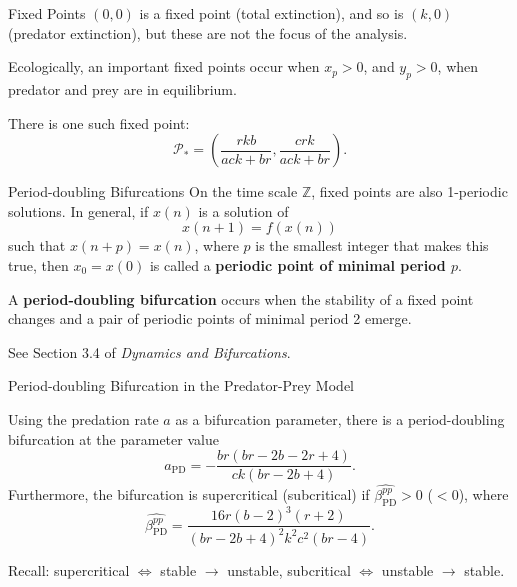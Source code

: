 \documentclass[]{beamer}
\begin{document}
	\begin{frame}{Fixed Points}
		$(0,0)$ is a fixed point (total extinction), and so is $(k,0)$ (predator extinction), but these are not the focus of the analysis.
		\vfill
		\pause
		
		Ecologically, an important fixed points occur when $x_p > 0$, and $y_p > 0$, when predator and prey are in equilibrium.
		\vfill
		\pause
		
		There is one such fixed point:
		\begin{equation*}
			\mathcal{P}_* = \left(\frac{rkb}{ack+br}, \frac{crk}{ack+br}\right).
		\end{equation*} 
	\end{frame}
	
	\begin{frame}{Period-doubling Bifurcations}
		On the time scale $\mathbb{Z}$, fixed points are also 1-periodic solutions. In general, if $x(n)$ is a solution of
		\begin{equation*}
			x(n+1) = f(x(n))
		\end{equation*}
		such that $x(n+p) = x(n)$, where $p$ is the smallest integer that makes this true, then $x_0 = x(0)$ is called a \textbf{periodic point of minimal period $p$}.
		\vfill
		\pause
		
		A \textbf{period-doubling bifurcation} occurs when the stability of a fixed point changes and a pair of periodic points of minimal period 2 emerge.
		\vfill
		\pause
		
		See Section 3.4 of \textit{Dynamics and Bifurcations}.
	\end{frame}
	
	\begin{frame}{Period-doubling Bifurcation in the Predator-Prey Model}
		\begin{block}{}
			Using the predation rate $a$ as a bifurcation parameter, there is a period-doubling bifurcation at the parameter value
			\begin{equation*}
				a_{\text{PD}} = -\frac{br(br-2b-2r+4)}{ck(br-2b+4)}.
			\end{equation*}
			Furthermore, the bifurcation is supercritical (subcritical) if $\widehat{\beta^{pp}_{\text{PD}}} > 0$ ($<0$), where
			\begin{equation*}
				\widehat{\beta^{pp}_{\text{PD}}} = \frac{16r(b-2)^3(r+2)}{(br-2b+4)^2k^2c^2(br-4)}.
			\end{equation*}
		\end{block}
		\vfill
		
		Recall: supercritical $\iff$ stable $\to$ unstable, subcritical $\iff$ unstable $\to$ stable.
	\end{frame}
	
\end{document}
